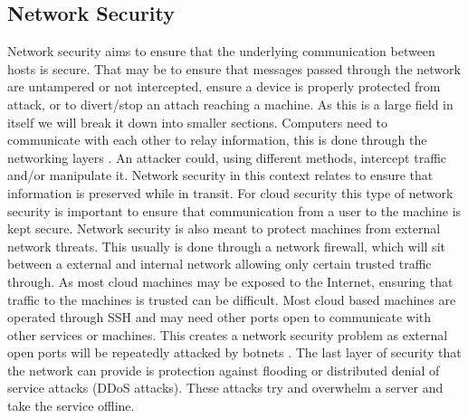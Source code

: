 \documentclass[12pt]{article}
\begin{document}
\subsection{Network Security}
Network security aims to ensure that the underlying communication between hosts is secure. That may be to ensure that messages passed through the network are untampered or not intercepted, ensure a device is properly protected from attack, or to divert/stop an attach reaching a machine. As this is a large field in itself we will break it down into smaller sections. Computers need to communicate with each other to relay information, this is done through the networking layers \cite{briscoe2000understanding}. An attacker could, using different methods, intercept traffic and/or manipulate it. Network security in this context relates to ensure that information is preserved while in transit. For cloud security this type of network security is important to ensure that communication from a user to the machine is kept secure. Network security is also meant to protect machines from external network threats. This usually is done through a network firewall, which will sit between a external and internal network allowing only certain trusted traffic through. As most cloud machines may be exposed to the Internet, ensuring that traffic to the machines is trusted can be difficult. Most cloud based machines are operated through SSH and may need other ports open to communicate with other services or machines. This creates a network security problem as external open ports will be repeatedly attacked by botnets \cite{cooke2005zombie}. The last layer of security that the network can provide is protection against flooding or distributed denial of service attacks (DDoS attacks). These attacks try and overwhelm a server and take the service offline.
\end{document}
